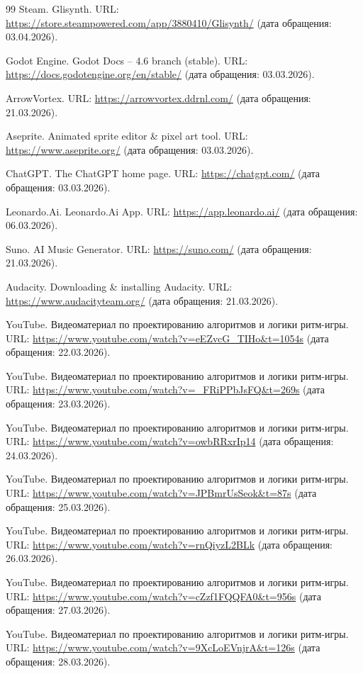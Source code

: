 \documentclass[utf8, russian]{eskdtext}
\numberwithin{equation}{section}
\begin{document}
\begin{thebibliography}{99}
Steam. Glisynth. URL: \url{https://store.steampowered.com/app/3880410/Glisynth/} (дата обращения: 03.04.2026).

Godot Engine. Godot Docs -- 4.6 branch (stable). URL: \url{https://docs.godotengine.org/en/stable/} (дата обращения: 03.03.2026).

ArrowVortex. URL: \url{https://arrowvortex.ddrnl.com/} (дата обращения: 21.03.2026).

Aseprite. Animated sprite editor \& pixel art tool. URL: \url{https://www.aseprite.org/} (дата обращения: 03.03.2026).

ChatGPT. The ChatGPT home page. URL: \url{https://chatgpt.com/} (дата обращения: 03.03.2026).

Leonardo.Ai. Leonardo.Ai App. URL: \url{https://app.leonardo.ai/} (дата обращения: 06.03.2026).

Suno. AI Music Generator. URL: \url{https://suno.com/} (дата обращения: 21.03.2026).

Audacity. Downloading \& installing Audacity. URL: \url{https://www.audacityteam.org/} (дата обращения: 21.03.2026).

YouTube. Видеоматериал по проектированию алгоритмов и логики ритм-игры. URL: \url{https://www.youtube.com/watch?v=eEZvcG_TIHo&t=1054s} (дата обращения: 22.03.2026).

YouTube. Видеоматериал по проектированию алгоритмов и логики ритм-игры. URL: \url{https://www.youtube.com/watch?v=_FRiPPbJsFQ&t=269s} (дата обращения: 23.03.2026).

YouTube. Видеоматериал по проектированию алгоритмов и логики ритм-игры. URL: \url{https://www.youtube.com/watch?v=owbRRxrIp14} (дата обращения: 24.03.2026).

YouTube. Видеоматериал по проектированию алгоритмов и логики ритм-игры. URL: \url{https://www.youtube.com/watch?v=JPBmrUsSeok&t=87s} (дата обращения: 25.03.2026).

YouTube. Видеоматериал по проектированию алгоритмов и логики ритм-игры. URL: \url{https://www.youtube.com/watch?v=rnQiyzL2BLk} (дата обращения: 26.03.2026).

YouTube. Видеоматериал по проектированию алгоритмов и логики ритм-игры. URL: \url{https://www.youtube.com/watch?v=cZzf1FQQFA0&t=956s} (дата обращения: 27.03.2026).

YouTube. Видеоматериал по проектированию алгоритмов и логики ритм-игры. URL: \url{https://www.youtube.com/watch?v=9XcLoEVnjrA&t=126s} (дата обращения: 28.03.2026).

\end{thebibliography}
\end{document}
